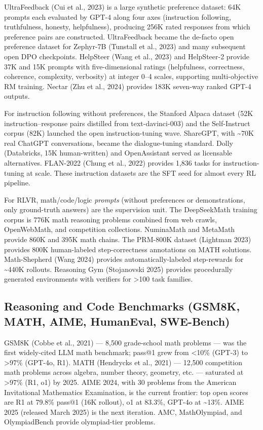 UltraFeedback (Cui et al., 2023) is a large synthetic preference dataset: 64K prompts each evaluated by GPT-4 along four axes (instruction following, truthfulness, honesty, helpfulness), producing 256K rated responses from which preference pairs are constructed. UltraFeedback became the de-facto open preference dataset for Zephyr-7B (Tunstall et al., 2023) and many subsequent open DPO checkpoints. HelpSteer (Wang et al., 2023) and HelpSteer-2 provide 37K and 15K prompts with five-dimensional ratings (helpfulness, correctness, coherence, complexity, verbosity) at integer 0--4 scales, supporting multi-objective RM training. Nectar (Zhu et al., 2024) provides 183K seven-way ranked GPT-4 outputs.

For instruction following without preferences, the Stanford Alpaca dataset (52K instruction--response pairs distilled from text-davinci-003) and the Self-Instruct corpus (82K) launched the open instruction-tuning wave. ShareGPT, with \textasciitilde70K real ChatGPT conversations, became the dialogue-tuning standard. Dolly (Databricks, 15K human-written) and OpenAssistant served as licensable alternatives. FLAN-2022 (Chung et al., 2022) provides 1,836 tasks for instruction-tuning at scale. These instruction datasets are the SFT seed for almost every RL pipeline.

For RLVR, math/code/logic \emph{prompts} (without preferences or demonstrations, only ground-truth answers) are the supervision unit. The DeepSeekMath training corpus is 776K math reasoning problems combined from web crawls, OpenWebMath, and competition collections. NuminaMath and MetaMath provide 860K and 395K math chains. The PRM-800K dataset (Lightman 2023) provides 800K human-labeled step-correctness annotations on MATH solutions. Math-Shepherd (Wang 2024) provides automatically-labeled step-rewards for \textasciitilde440K rollouts. Reasoning Gym (Stojanovski 2025) provides procedurally generated environments with verifiers for \textgreater100 task families.

\subsection{Reasoning and Code Benchmarks (GSM8K, MATH, AIME, HumanEval, SWE-Bench)}\label{reasoning-and-code-benchmarks-gsm8k-math-aime-humaneval-swe-bench}

GSM8K (Cobbe et al., 2021) --- 8,500 grade-school math problems --- was the first widely-cited LLM math benchmark; pass@1 grew from \textless10\% (GPT-3) to \textgreater97\% (GPT-4o, R1). MATH (Hendrycks et al., 2021) --- 12,500 competition math problems across algebra, number theory, geometry, etc. --- saturated at \textgreater97\% (R1, o1) by 2025. AIME 2024, with 30 problems from the American Invitational Mathematics Examination, is the current frontier: top open scores are R1 at 79.8\% pass@1 (16K rollout), o1 at 83.3\%, GPT-4o at \textasciitilde13\%. AIME 2025 (released March 2025) is the next iteration. AMC, MathOlympiad, and OlympiadBench provide olympiad-tier problems.

